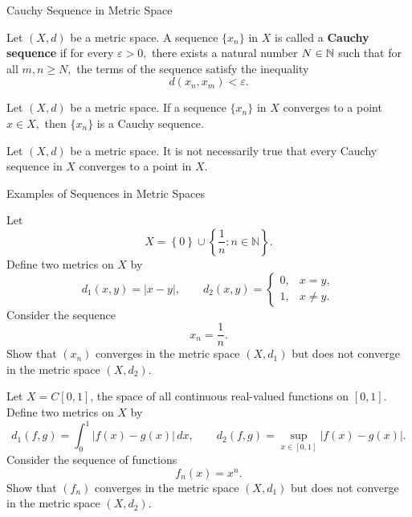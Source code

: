 \documentclass[12pt, a4paper]{article}
\begin{document}
\clearpage

\begin{heading}
    Cauchy Sequence in Metric Space
\end{heading}

\vspace{10pt}

\begin{definition}
    Let $(X, d)$ be a metric space. A sequence $\{x_n\}$ in $X$ is called a \textbf{Cauchy sequence} if for every $\varepsilon > 0,$ there exists a natural number $N \in \mathbb{N}$ such that for all $m, n \geq N,$ the terms of the sequence satisfy the inequality
    \[
    d(x_n, x_m) < \varepsilon.
    \]
\end{definition}

\clearpage

\begin{theorem}
    Let $(X, d)$ be a metric space. If a sequence $\{x_n\}$ in $X$ converges to a point $x \in X,$ then $\{x_n\}$ is a Cauchy sequence.
\end{theorem}

\clearpage

\clearpage

\begin{theorem}
    Let $(X, d)$ be a metric space. It is not necessarily true that every Cauchy sequence in $X$ converges to a point in $X$.
\end{theorem}

\clearpage

\begin{heading}
    Examples of Sequences in Metric Spaces
\end{heading}

\vspace{10pt}

\begin{problem}
Let
\[
X=\left\{0\right\}\cup\left\{\frac1n : n\in\mathbb N\right\}.
\]
Define two metrics on \(X\) by
\[
d_1(x,y)=|x-y|,
\qquad
d_2(x,y)=
\begin{cases}
0, & x=y,\\
1, & x\ne y.
\end{cases}
\]
Consider the sequence
\[
x_n=\frac1n.
\]
Show that \((x_n)\) converges in the metric space \((X,d_1)\) but does not converge in the metric space \((X,d_2)\).
\end{problem}
\clearpage


\begin{problem}
Let \(X=C[0,1]\), the space of all continuous real-valued functions on \([0,1]\). Define two metrics on \(X\) by
\[
d_1(f,g)=\int_0^1 |f(x)-g(x)|\,dx,
\qquad
d_2(f,g)=\sup_{x\in[0,1]} |f(x)-g(x)|.
\]
Consider the sequence of functions
\[
f_n(x)=x^n.
\]
Show that \((f_n)\) converges in the metric space \((X,d_1)\) but does not converge in the metric space \((X,d_2)\).
\end{problem}
\clearpage
\end{document}
